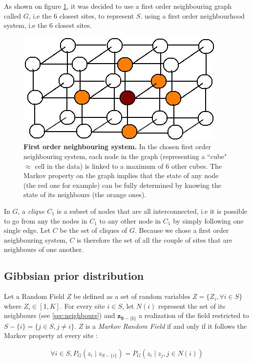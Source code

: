 As shown on figure \ref{fig:graph}, it was decided to use a first order neighbouring graph called $G$, i.e the 6 closest sites, to represent $S$.  using a first order neighbourhood system, i.e the 6 closest sites.\\

	\begin{figure}[h]
\centerline{\includegraphics[width=0.5\linewidth]{gfx/chapter4/graph.jpg}}
\caption{{\bf First order neighbouring system.} In the chosen first order neighbouring system, each node in the graph (representing a ``cube" $\approx$ cell in the data) is linked to a maximum of 6 other cubes. The Markov property on the graph implies that the state of any node (the red one for example) can be fully determined by knowing the state of its neighbours (the orange ones).}\label{fig:graph}
	\end{figure}

In $G$, a \emph{clique} $C_1$ is a subset of nodes that are all interconnected, i.e it is possible to go from any the nodes in $C_1$ to any other node in $C_1$ by simply following one single edge. Let $C$ be the set of cliques of $G$. Because we chose a first order neighbouring system, $C$ is therefore the set of all the couple of sites that are neighbours of one another.

	\subsection{Gibbsian prior distribution}
Let a Random Field $Z$ be defined as a set of random variables $Z = \{Z_i , \forall i \in S\}$ where $Z_i \in [1,K]$. For every site $i \in S$, let $N(i)$ represent the set of its neighbours (see \ref{sec:neighbours}) and $\boldsymbol{z_{S-\{i\}}}$ a realization of the field restricted to $S-\{i\} = \{j \in S, j \neq i\}$. $Z$ is a \emph{Markov Random Field} if and only if it follows the Markov property at every site :

\begin{align}
\label{eq:markov1}
\forall i \in S, P_G (z_i \mid z_{S-\{i\}}) = P_G (z_i \mid z_j , j \in N(i))
\end{align}

